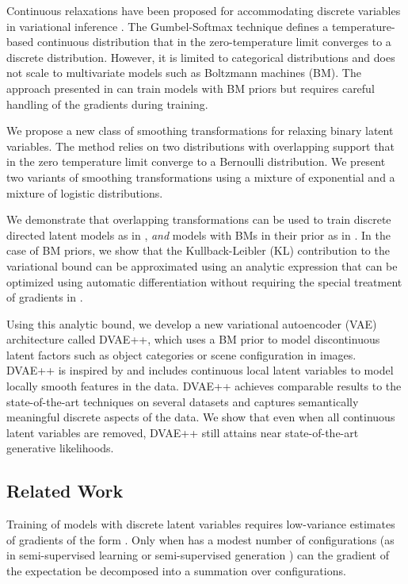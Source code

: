 \documentclass{article}
\begin{document}
Continuous relaxations have been proposed for accommodating discrete variables in variational inference 
\cite{maddison2016concrete, jang2016categorical, rolfe2016discrete}. 
The Gumbel-Softmax technique \cite{maddison2016concrete, jang2016categorical}
defines a temperature-based continuous distribution that in the zero-temperature limit converges to a discrete distribution. However, it is limited to categorical distributions and 
does not scale to multivariate models such as Boltzmann machines (BM). The approach presented in 
\cite{rolfe2016discrete} can train models with BM priors but requires careful handling of the gradients during training.

We propose a new class of smoothing transformations for relaxing binary latent variables. The method relies on two 
distributions with overlapping support that in the zero temperature limit converge to a Bernoulli distribution.
We present two variants of smoothing transformations using a mixture of exponential and a mixture of logistic distributions.

We demonstrate that overlapping transformations can be used to train discrete directed
latent models as in \cite{maddison2016concrete, jang2016categorical}, \textit{and} models with BMs in their prior as in \cite{rolfe2016discrete}.
In the case of BM priors, we show that the Kullback-Leibler (KL) contribution to the variational bound can be approximated using an analytic expression that can be optimized using automatic differentiation without requiring the special treatment of gradients in \cite{rolfe2016discrete}.

Using this analytic bound, we develop a new variational autoencoder (VAE) architecture called DVAE++, 
which uses a BM prior to model discontinuous latent factors such as object categories or scene configuration in images. 
DVAE++ is inspired by \cite{rolfe2016discrete} and includes continuous local latent variables to model locally 
smooth features in the data. DVAE++ achieves 
comparable results to the state-of-the-art techniques on several datasets 
and captures semantically meaningful discrete aspects of the data. 
We show that even when all continuous latent variables are removed, DVAE++ still attains near state-of-the-art generative 
likelihoods.

\subsection{Related Work}
Training of models with discrete latent variables  requires low-variance estimates of gradients of the form . Only when  has a modest number of configurations 
(as in semi-supervised learning \cite{kingma2014semi} or semi-supervised generation \cite{maaloe2017semi}) 
can the gradient of the expectation be decomposed into a summation over configurations.
\end{document}
